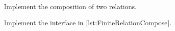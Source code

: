 
\begin{codeexercise}
    Implement the composition of two relations.

    Implement the interface in \cref{lst:FiniteRelationCompose}.
\end{codeexercise}


